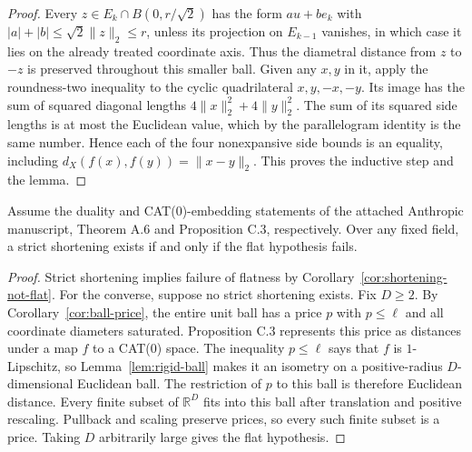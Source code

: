 \begin{proof}
Every $z\in E_k\cap B(0,r/\sqrt2)$ has the form $a u+b e_k$ with
$|a|+|b|\le\sqrt2\|z\|_2\le r$, unless its projection on $E_{k-1}$
vanishes, in which case it lies on the already treated coordinate axis.
Thus the diametral distance from $z$ to $-z$ is preserved throughout
this smaller ball.  Given any $x,y$ in it, apply the roundness-two
inequality to the cyclic quadrilateral $x,y,-x,-y$.  Its image has the
sum of squared diagonal lengths
$4\|x\|_2^2+4\|y\|_2^2$.  The sum of its squared side lengths is at
most the Euclidean value, which by the parallelogram identity is the
same number.  Hence each of the four nonexpansive side bounds is an
equality, including $d_X(f(x),f(y))=\|x-y\|_2$.  This proves the
inductive step and the lemma.
\end{proof}

\begin{theorem}
\label{thm:shortening-flat-equivalence}
Assume the duality and CAT(0)-embedding statements of the attached
Anthropic manuscript, Theorem A.6 and Proposition C.3, respectively.
Over any fixed field, a strict shortening exists if and only if the flat
hypothesis fails.
\end{theorem}
\begin{proof}
Strict shortening implies failure of flatness by
Corollary~\ref{cor:shortening-not-flat}.  For the converse, suppose no
strict shortening exists.  Fix $D\ge2$.  By
Corollary~\ref{cor:ball-price}, the entire unit ball has a price $p$ with
$p\le\ell$ and all coordinate diameters saturated.  Proposition C.3
represents this price as distances under a map $f$ to a CAT(0) space.
The inequality $p\le\ell$ says that $f$ is $1$-Lipschitz, so
Lemma~\ref{lem:rigid-ball} makes it an isometry on a positive-radius
$D$-dimensional Euclidean ball.  The restriction of $p$ to this ball
is therefore Euclidean distance.  Every finite subset of $\mathbb R^D$
fits into this ball after translation and positive rescaling.  Pullback
and scaling preserve prices, so every such finite subset is a price.
Taking $D$ arbitrarily large gives the flat hypothesis.
\end{proof}

